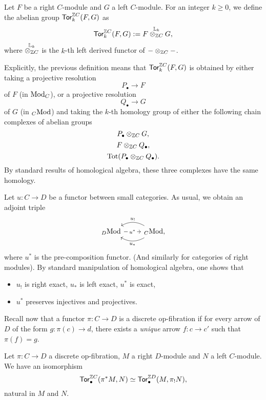 \documentclass{amsart}
\newcommand{\Tot}{\mathrm{Tot}}
\begin{document}
\begin{definition}
  Let $F$ be a right $C$\nbd-module and $G$ a left $C$\nbd-module. For
  an integer $k \geq 0$, we
  define the abelian group $\mathsf{Tor}^{\mathbb Z C}_{k}(F,G)$ as
  \[
    \mathsf{Tor}^{\mathbb Z C}_{k}(F,G) := F \overset{\mathbb{L}_k}{\otimes_{\mathbb Z C}} G,
  \]
  where $\overset{\mathbb{L}_k}{\otimes_{\mathbb Z C}}$ is the $k$\nbd-th left
  derived functor of $-\otimes_{\mathbb Z C}-$.
\end{definition}
\begin{paragr}
  Explicitly, the previous definition means that $\mathsf{Tor}^{\mathbb Z C}_{k}(F,G)$ is
  obtained by either taking a projective resolution
  \[
    P_{\bullet} \to F
  \]
  of $F$ (in $\mathrm{Mod}_{C}$), or a projective resolution
  \[
    Q_{\bullet} \to G
  \]
  of $G$ (in ${}_{C}\mathrm{Mod}$) and taking the $k$\nbd-th homology group of
  either the following chain complexes of abelian groups
  \[P_{\bullet}\otimes_{\mathbb Z C}G,\]
  \[F\otimes_{\mathbb Z C}Q_{\bullet},\]
    \[\Tot(P_{\bullet}\tens{\Z C}Q_{\bullet}). \]
  By standard results of homological algebra, these three complexes
  have the same homology. 
\end{paragr}
\begin{paragr}
  Let $u \colon C \to D$ be a functor between small categories.  As usual, we obtain an adjoint triple
  \[
    \begin{tikzcd}
      \LMod{D} \ar[r,"u^*" description] &
      \LMod{C},\ar[l,"u_!"',bend right] \ar[l,"u_*",bend left]
    \end{tikzcd}
  \]
  where $u^*$ is the pre-composition functor. (And similarly for
  categories of right modules). By standard manipulation of
  homological algebra, one shows that
  \begin{itemize}
  \item $u_!$ is right exact, $u_*$ is left exact, $u^*$ is exact,
  \item $u^*$ preserves injectives and projectives.
  \end{itemize}

  Recall now that a functor $\pi \colon C \to D$ is a discrete
  op-fibration if for every arrow of $D$ of the form $g\colon \pi(c) \to
  d$, there exists a \emph{unique} arrow $f \colon c \to c'$ such
  that $\pi(f)=g$. 
\end{paragr}
\begin{proposition}\label{prop:toropfib}
  Let $\pi \colon C \to D$ a discrete op-fibration, $M$ a right
  $D$\nbd-module and $N$ a left $C$\nbd-module. We have an
  isomorphism
  \[
  \mathsf{Tor}^{\mathbb Z C}_{\bullet}(\pi^*M,N) \simeq \mathsf{Tor}^{\mathbb Z D}_{\bullet}(M,\pi_!N),
  \]
  natural in $M$ and $N$.
\end{proposition}
\end{document}
